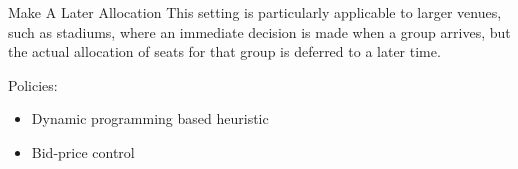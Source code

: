     \begin{frame}{Make A Later Allocation}
      This setting is particularly applicable to larger venues, such as stadiums, where an immediate decision is made when a group arrives, but the actual allocation of seats for that group is deferred to a later time.

      Policies: 

      \begin{itemize}
        \item Dynamic programming based heuristic
        \item Bid-price control
      \end{itemize}

  \end{frame}
